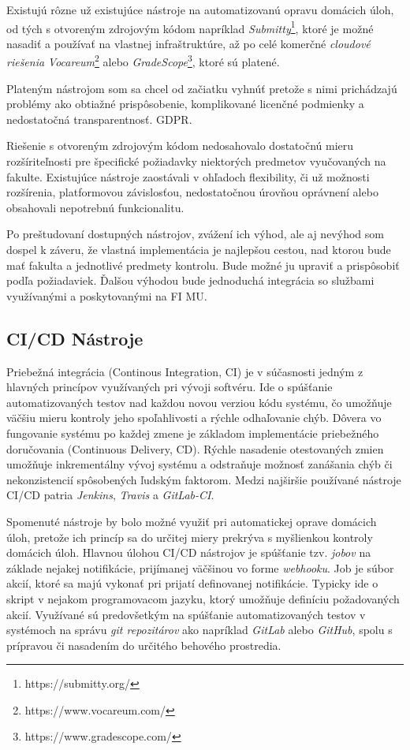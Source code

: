 \documentclass[
  digital, %
  twoside, %
  table,   %
  lof,     %
  lot,     %
]{fithesis3}
\begin{document}
Existujú rôzne už existujúce nástroje na automatizovanú opravu domácich úloh, od tých s otvoreným zdrojovým kódom napríklad  \textit{Submitty}\footnote{https://submitty.org/}, ktoré je možné nasadiť a používať na vlastnej infraštruktúre, až po celé komerčné \emph{cloudové riešenia} \textit{Vocareum}\footnote{https://www.vocareum.com/} alebo \textit{GradeScope}\footnote{https://www.gradescope.com/}, ktoré sú platené.

Plateným nástrojom som sa chcel od začiatku vyhnúť pretože s nimi prichádzajú problémy ako obtiažné prispôsobenie, komplikované licenčné podmienky a nedostatočná transparentnosť. GDPR.

Riešenie s otvoreným zdrojovým kódom nedosahovalo dostatočnú mieru rozšíriteľnosti pre špecifické požiadavky niektorých predmetov vyučovaných na fakulte.
Existujúce nástroje zaostávali v ohľadoch flexibility, či už možnosti rozšírenia, platformovou závislosťou, nedostatočnou úrovňou oprávnení alebo obsahovali nepotrebnú funkcionalitu.

Po preštudovaní dostupných nástrojov, zvážení ich výhod, ale aj nevýhod som dospel k záveru, že vlastná implementácia je najlepšou cestou, nad ktorou bude mať fakulta a jednotlivé predmety kontrolu. Bude možné ju upraviť a prispôsobiť podľa požiadaviek. Ďalšou výhodou bude jednoduchá integrácia so službami využívanými a poskytovanými na FI MU.

\subsection{CI/CD Nástroje}

Priebežná integrácia (Continous Integration, CI) je v súčasnosti jedným z hlavných princípov využívaných pri vývoji softvéru. Ide o spúšťanie automatizovaných testov nad každou novou verziou kódu systému, čo umožňuje väčšiu mieru kontroly jeho spoľahlivosti a rýchle odhaľovanie chýb. Dôvera vo fungovanie systému po každej zmene je základom implementácie priebežného doručovania (Continuous Delivery, CD). Rýchle nasadenie otestovaných zmien umožňuje inkrementálny vývoj systému a odstraňuje možnosť zanášania chýb či nekonzistencií spôsobených ľudským faktorom. Medzi najširšie používané nástroje CI/CD patria \textit{Jenkins}, \textit{Travis} a \textit{GitLab-CI}. 

Spomenuté nástroje by bolo možné využiť pri automatickej oprave domácich úloh, pretože ich princíp sa do určitej miery prekrýva s myšlienkou kontroly domácich úloh. Hlavnou úlohou CI/CD nástrojov je spúšťanie tzv. \emph{jobov} na základe nejakej notifikácie, prijímanej väčšinou vo forme \emph{webhooku}. Job je súbor akcií, ktoré sa majú vykonať pri prijatí definovanej notifikácie. Typicky ide o skript v nejakom programovacom jazyku, ktorý umožňuje definíciu požadovaných akcií. Využívané sú predovšetkým na spúšťanie automatizovaných testov v systémoch na správu \emph{git repozitárov} ako napríklad \emph{GitLab} alebo \emph{GitHub}, spolu s prípravou či nasadením do určitého behového prostredia.  
\end{document}
